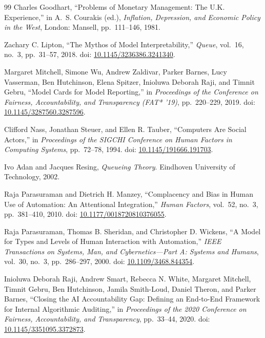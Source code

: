 \documentclass[11pt]{article}
\begin{document}
\begin{thebibliography}{99}
Charles Goodhart,
``Problems of Monetary Management:
The U.K. Experience,''
in A.~S. Courakis (ed.),
\textit{Inflation, Depression, and Economic Policy in the West},
London: Mansell, pp.~111--146, 1981.

Zachary C. Lipton,
``The Mythos of Model Interpretability,''
\textit{Queue},
vol.~16, no.~3, pp.~31--57, 2018.
doi: \href{https://doi.org/10.1145/3236386.3241340}
{10.1145/3236386.3241340}.

Margaret Mitchell, Simone Wu, Andrew Zaldivar,
Parker Barnes, Lucy Vasserman, Ben Hutchinson,
Elena Spitzer, Inioluwa Deborah Raji, and Timnit Gebru,
``Model Cards for Model Reporting,''
in \textit{Proceedings of the Conference on Fairness,
Accountability, and Transparency (FAT* '19)},
pp.~220--229, 2019.
doi: \href{https://doi.org/10.1145/3287560.3287596}
{10.1145/3287560.3287596}.

Clifford Nass, Jonathan Steuer, and Ellen R. Tauber,
``Computers Are Social Actors,''
in \textit{Proceedings of the SIGCHI Conference on
Human Factors in Computing Systems},
pp.~72--78, 1994.
doi: \href{https://doi.org/10.1145/191666.191703}
{10.1145/191666.191703}.

Ivo Adan and Jacques Resing,
\textit{Queueing Theory}.
Eindhoven University of Technology, 2002.

Raja Parasuraman and Dietrich H. Manzey,
``Complacency and Bias in Human Use of Automation:
An Attentional Integration,''
\textit{Human Factors},
vol.~52, no.~3, pp.~381--410, 2010.
doi: \href{https://doi.org/10.1177/0018720810376055}
{10.1177/0018720810376055}.

Raja Parasuraman, Thomas B. Sheridan, and
Christopher D. Wickens,
``A Model for Types and Levels of Human Interaction
with Automation,''
\textit{IEEE Transactions on Systems, Man, and Cybernetics---Part A:
Systems and Humans},
vol.~30, no.~3, pp.~286--297, 2000.
doi: \href{https://doi.org/10.1109/3468.844354}
{10.1109/3468.844354}.

Inioluwa Deborah Raji, Andrew Smart,
Rebecca N. White, Margaret Mitchell,
Timnit Gebru, Ben Hutchinson, Jamila Smith-Loud,
Daniel Theron, and Parker Barnes,
``Closing the AI Accountability Gap:
Defining an End-to-End Framework for Internal
Algorithmic Auditing,''
in \textit{Proceedings of the 2020 Conference on Fairness,
Accountability, and Transparency},
pp.~33--44, 2020.
doi: \href{https://doi.org/10.1145/3351095.3372873}
{10.1145/3351095.3372873}.


\end{thebibliography}
\end{document}
